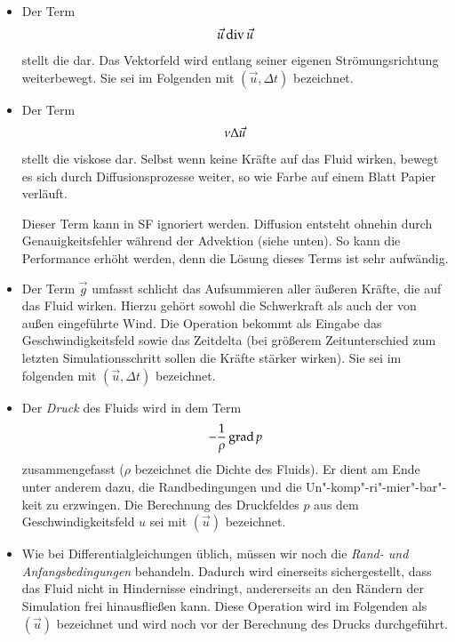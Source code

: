 \begin{itemize}
\item
	Der Term
	\begin{equation}
	\vec{u} \operatorname*{div} \vec{u}
	\end{equation}
	stellt die  dar. Das Vektorfeld wird entlang
	seiner eigenen Strömungsrichtung weiterbewegt. Sie sei im Folgenden mit
	$(\vec{u},\Delta t)$ bezeichnet.
\item
	Der Term
	\begin{equation}
	\nu \Delta \vec{u}
	\end{equation}
	stellt die viskose  dar. Selbst wenn keine
	Kräfte auf das Fluid wirken, bewegt es sich durch Diffusionsprozesse
	weiter, so wie Farbe auf einem Blatt Papier verläuft.

	Dieser Term kann in SF ignoriert werden. Diffusion entsteht
	ohnehin  durch Genauigkeitsfehler während der
	Advektion (siehe unten). So kann die Performance erhöht werden, denn die
	Lösung dieses Terms ist sehr aufwändig.
\item
	Der Term $\vec{g}$ umfasst schlicht das Aufsummieren aller äußeren
	Kräfte, die auf das Fluid wirken. Hierzu gehört sowohl die Schwerkraft
	als auch der von außen eingeführte Wind. Die Operation bekommt als
	Eingabe das Geschwindigkeitsfeld sowie das Zeitdelta (bei größerem
	Zeitunterschied zum letzten Simulationsschritt sollen die Kräfte
	stärker wirken). Sie sei im folgenden mit
	$(\vec{u},\Delta t)$ bezeichnet.
\item
	Der \emph{Druck} des Fluids wird in dem Term
	\begin{equation}
	-\frac{1}{\rho} \operatorname*{grad} p
	\end{equation}
	zusammengefasst ($\rho$ bezeichnet die Dichte des Fluids). Er
        dient am Ende unter anderem dazu, die Randbedingungen und die
        Un"-komp"-ri"-mier"-bar"-keit zu erzwingen. Die Berechnung des
        Druckfeldes $p$ aus dem Geschwindigkeitsfeld $u$ sei mit
        $(\vec{u})$ bezeichnet.
\item
	Wie bei Differentialgleichungen üblich, müssen wir noch die
	\emph{Rand- und Anfangsbedingungen} behandeln. Dadurch wird
	einerseits sichergestellt, dass das Fluid nicht in Hindernisse
	eindringt, andererseits an den Rändern der Simulation frei hinausfließen
	kann. Diese Operation wird im Folgenden als
	$(\vec{u})$ bezeichnet und wird noch vor der
	Berechnung des Drucks durchgeführt.
\end{itemize}

